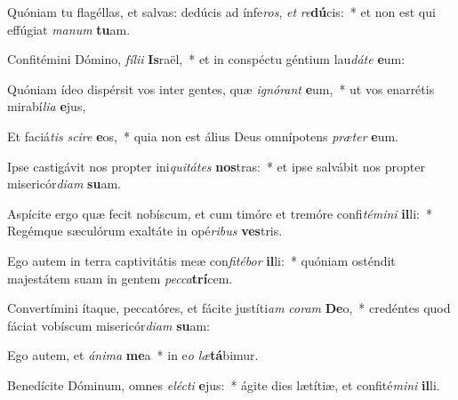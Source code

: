 \item Quóniam tu flagéllas, et salvas: dedúcis ad ínfe\textit{ros}, \textit{et} \textit{re}\textbf{dú}cis:~* et non est qui effúgiat \textit{ma}\textit{num} \textbf{tu}am.
\item Confitémini Dómino, \textit{fí}\textit{li}\textit{i} \textbf{Is}raël,~* et in conspéctu géntium lau\textit{dá}\textit{te} \textbf{e}um:
\item Quóniam ídeo dispérsit vos inter gentes, quæ \textit{i}\textit{gnó}\textit{rant} \textbf{e}um,~* ut vos enarrétis mirabí\textit{li}\textit{a} \textbf{e}jus,
\item Et faciá\textit{tis} \textit{sci}\textit{re} \textbf{e}os,~* quia non est álius Deus omnípotens \textit{præ}\textit{ter} \textbf{e}um.
\item Ipse castigávit nos propter ini\textit{qui}\textit{tá}\textit{tes} \textbf{nos}tras:~* et ipse salvábit nos propter misericór\textit{di}\textit{am} \textbf{su}am.
\item Aspícite ergo quæ fecit nobíscum, et cum timóre et tremóre confi\textit{té}\textit{mi}\textit{ni} \textbf{il}li:~* Regémque sæculórum exaltáte in opé\textit{ri}\textit{bus} \textbf{ves}tris.
\item Ego autem in terra captivitátis meæ con\textit{fi}\textit{té}\textit{bor} \textbf{il}li:~* quóniam osténdit majestátem suam in gentem \textit{pec}\textit{ca}\textbf{trí}cem.
\item Convertímini ítaque, peccatóres, et fácite justíti\textit{am} \textit{co}\textit{ram} \textbf{De}o,~* credéntes quod fáciat vobíscum misericór\textit{di}\textit{am} \textbf{su}am:
\item Ego autem, et \textit{á}\textit{ni}\textit{ma} \textbf{me}a~* in e\textit{o} \textit{læ}\textbf{tá}bimur.
\item Benedícite Dóminum, omnes \textit{e}\textit{léc}\textit{ti} \textbf{e}jus:~* ágite dies lætítiæ, et confité\textit{mi}\textit{ni} \textbf{il}li.
